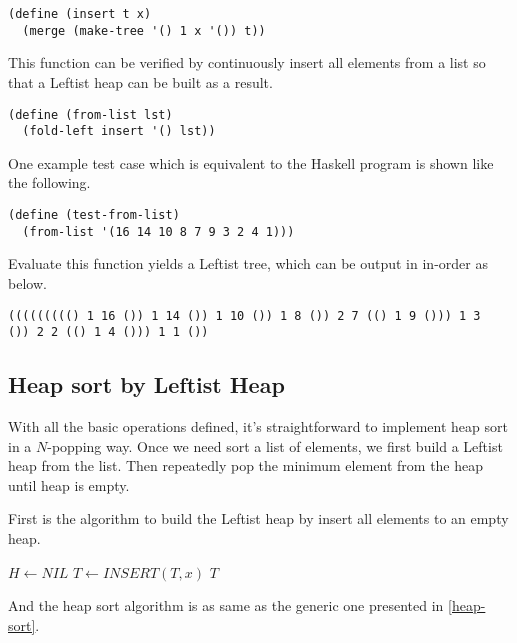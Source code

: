 \documentclass{article}
\begin{document}
\lstset{language=lisp}
\begin{lstlisting}
(define (insert t x)
  (merge (make-tree '() 1 x '()) t))
\end{lstlisting}

This function can be verified by continuously insert all elements
from a list so that a Leftist heap can be built as a result.

\begin{lstlisting}
(define (from-list lst)
  (fold-left insert '() lst))
\end{lstlisting}

One example test case which is equivalent to the Haskell program
is shown like the following.

\begin{lstlisting}
(define (test-from-list)
  (from-list '(16 14 10 8 7 9 3 2 4 1)))
\end{lstlisting}

Evaluate this function yields a Leftist tree, which can be output
in in-order as below.

\begin{lstlisting}
((((((((() 1 16 ()) 1 14 ()) 1 10 ()) 1 8 ()) 2 7 (() 1 9 ())) 1 3
()) 2 2 (() 1 4 ())) 1 1 ())
\end{lstlisting}

\subsection{Heap sort by Leftist Heap}

With all the basic operations defined, it's straightforward to
implement heap sort in a $N$-popping way. Once we need sort a
list of elements, we first build a Leftist heap from the list.
Then repeatedly pop the minimum element from the heap until heap
is empty.

First is the algorithm to build the Leftist heap by insert all
elements to an empty heap.

\begin{algorithmic}[1]
  \State $H \gets NIL$
    \State $T \gets INSERT(T, x)$
  \EndFor
  \State \Return $T$
\EndFunction
\end{algorithmic}

And the heap sort algorithm is as same as the generic one presented
in \ref{heap-sort}.
\end{document}
